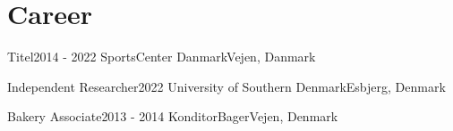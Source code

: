 \section{Career}
\mySubHeadingListStart

  \mySubHeading
  {Titel}{2014 - 2022}
  {SportsCenter Danmark}{Vejen, Danmark}
    \myItemListStart
    \myItemListEnd

  \mySubHeading
  {Independent Researcher}{2022}
  {University of Southern Denmark}{Esbjerg, Denmark}
    \myItemListStart
    \myItemListEnd

  \mySubHeading
  {Bakery Associate}{2013 - 2014}
  {KonditorBager}{Vejen, Denmark}
    \myItemListStart
    \myItemListEnd

\mySubHeadingListEnd

